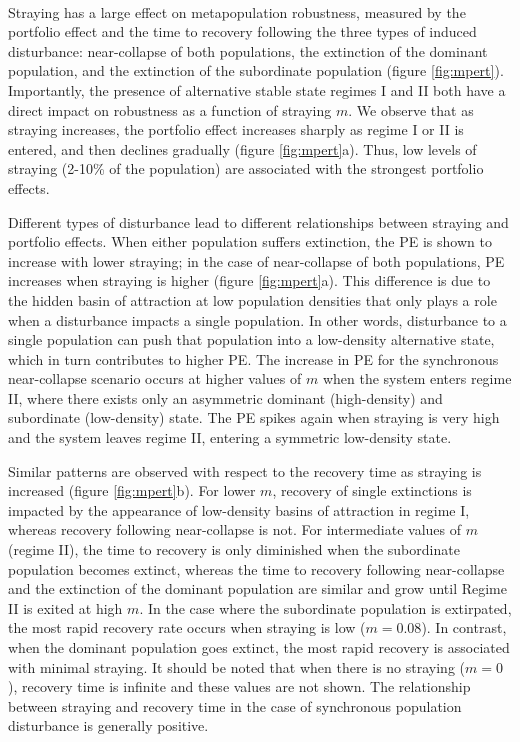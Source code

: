 \documentclass{revtex4}
\begin{document}
 \\
Straying has a large effect on metapopulation robustness, measured by the portfolio effect and the time to recovery following the three types of induced disturbance: near-collapse of both populations, the extinction of the dominant population, and the extinction of the subordinate population (figure \ref{fig:mpert}).
Importantly, the presence of alternative stable state regimes I and II both have a direct impact on robustness as a function of straying $m$.
We observe that as straying increases, the portfolio effect increases sharply as regime I or II is entered, and then declines gradually (figure \ref{fig:mpert}a).
Thus, low levels of straying (2-10\% of the population) are associated with the strongest portfolio effects.

Different types of disturbance lead to different relationships between straying and portfolio effects.
When either population suffers extinction, the PE is shown to increase with lower straying; in the case of near-collapse of both populations, PE increases when straying is higher (figure \ref{fig:mpert}a).
This difference is due to the hidden basin of attraction at low population densities that only plays a role when a disturbance impacts a single population.
In other words, disturbance to a single population can push that population into a low-density alternative state, which in turn contributes to higher PE.
The increase in PE for the synchronous near-collapse scenario occurs at higher values of $m$ when the system enters regime II, where there exists only an asymmetric dominant (high-density) and subordinate (low-density) state.
The PE spikes again when straying is very high and the system leaves regime II, entering a symmetric low-density state.


Similar patterns are observed with respect to the recovery time as straying is increased (figure \ref{fig:mpert}b).
For lower $m$, recovery of single extinctions is impacted by the appearance of low-density basins of attraction in regime I, whereas recovery following near-collapse is not.
For intermediate values of $m$ (regime II), the time to recovery is only diminished when the subordinate population becomes extinct, whereas the time to recovery following near-collapse and the extinction of the dominant population are similar and grow until Regime II is exited at high $m$.
In the case where the subordinate population is extirpated, the most rapid recovery rate occurs when straying is low ($m = 0.08$). 
In contrast, when the dominant population goes extinct, the most rapid recovery is associated with minimal straying. 
It should be noted that when there is no straying ($m = 0$), recovery time is infinite and these values are not shown. 
The relationship between straying and recovery time in the case of synchronous population disturbance is generally positive.
\end{document}
